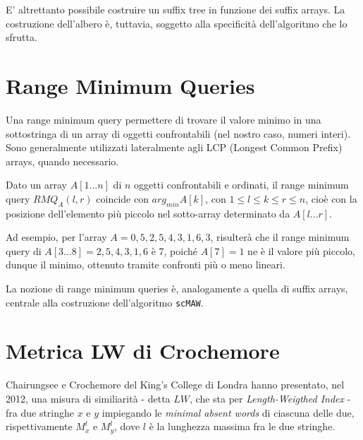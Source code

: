 \vspace{3mm}

E' altrettanto possibile costruire un suffix tree in funzione dei suffix arrays. La costruzione dell'albero è, tuttavia, soggetto alla specificità dell'algoritmo che lo sfrutta.

\section{Range Minimum Queries}

Una range minimum query \cite{RMQ} permettere di trovare il valore minimo in una sottostringa di un array di oggetti confrontabili (nel nostro caso, numeri interi). Sono generalmente utilizzati lateralmente agli LCP (Longest Common Prefix) arrays, quando necessario.

\vspace{3mm}

Dato un array $A[1...n]$ di $n$ oggetti confrontabili e ordinati, il range minimum query $RMQ_A (l,r)$ coincide con $arg_{min} A[k]$, con $1\leq l\leq k \leq r \leq n$, cioè con la posizione dell'elemento più piccolo nel sotto-array determinato da $A[l...r]$. 

\vspace{3mm}

Ad esempio, per l'array $A=0,5,2,5,4,3,1,6,3$, risulterà che il range minimum query di $A[3...8]=2,5,4,3,1,6$ è 7, poiché $A[7]=1$ ne è il valore più piccolo, dunque il minimo, ottenuto tramite confronti più o meno lineari.

\vspace{3mm}

La nozione di range minimum queries è, analogamente a quella di suffix arrays, centrale alla costruzione dell'algoritmo \verb|scMAW|.

\section{Metrica LW di Crochemore}

Chairungsee e Crochemore del King's College di Londra hanno presentato, nel 2012, una misura di similiarità - detta $LW$, che sta per \textit{Length-Weigthed Index} - fra due stringhe $x$ e $y$ impiegando le \textit{minimal absent words} \cite{CHAIRUNGSEE2012109} di ciascuna delle due, rispettivamente $M^l_x$ e $M^l_y$, dove $l$ è la lunghezza massima fra le due stringhe.

\vspace{3mm}

